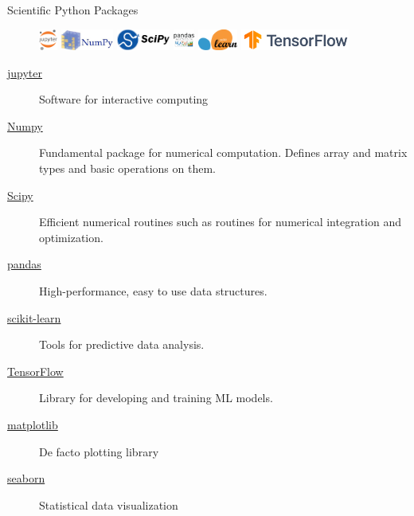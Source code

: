 \documentclass[aspectratio=169]{beamer}
\begin{document}
    \begin{frame}{Scientific Python Packages}
        \begin{figure}
            \centering
            \includegraphics[height=0.7cm]{figures/jupyter-logo.png}
            \includegraphics[height=0.7cm]{figures/numpy-logo.jpeg}
            \includegraphics[height=0.7cm]{figures/scipy-logo.png}
            \includegraphics[height=0.7cm]{figures/pandas-logo.png}
            \includegraphics[height=0.7cm]{figures/scikit-learn-logo.png}
            \includegraphics[height=0.7cm]{figures/tensorflow-logo.png}
        \end{figure}
        \begin{description}
            \item[\href{http://jupyter.org/}{jupyter}] Software for interactive computing
            \item[\href{http://www.scipy.org/}{Numpy}] Fundamental package for numerical computation. Defines array and matrix types and basic operations on them.
            \item[\href{http://www.scipy.org/}{Scipy}] Efficient numerical routines such as routines for numerical integration and optimization.
            \item[\href{http://pandas.pydata.org/}{pandas}] High-performance, easy to use data structures.
            \item[\href{http://scikit-learn.org/}{scikit-learn}] Tools for predictive data analysis.
            \item[\href{http://www.tensorflow.org/}{TensorFlow}] Library for developing and training ML models.
            \item[\href{http://matplotlib.org/}{matplotlib}] De facto plotting library
            \item[\href{http://seaborn.pydata.org/}{seaborn}] Statistical data visualization
        \end{description}
    \end{frame}
\end{document}
